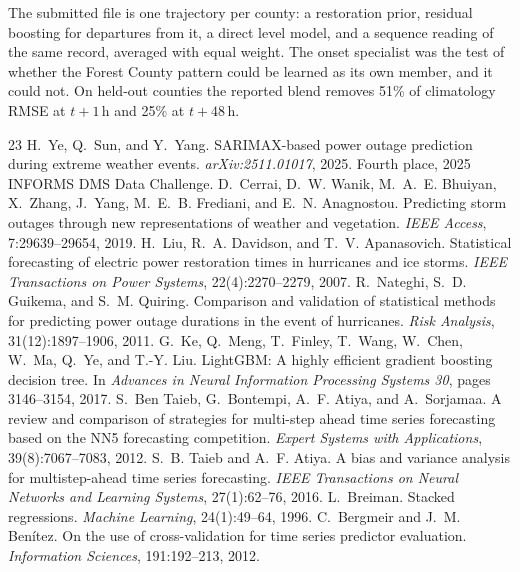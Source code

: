 \documentclass[10pt]{article}
\begin{document}
The submitted file is one trajectory per county: a restoration prior, residual boosting for departures from it, a direct level model, and a sequence reading of the same record, averaged with equal weight. The onset specialist was the test of whether the Forest County pattern could be learned as its own member, and it could not. On held-out counties the reported blend removes 51\% of climatology RMSE at $t{+}1$\,h and 25\% at $t{+}48$\,h.

\clearpage
\small

\begin{thebibliography}{23}
 H.~Ye, Q.~Sun, and Y.~Yang. SARIMAX-based power outage prediction during extreme weather events. \emph{arXiv:2511.01017}, 2025. Fourth place, 2025 INFORMS DMS Data Challenge.
 D.~Cerrai, D.~W. Wanik, M.~A.~E. Bhuiyan, X.~Zhang, J.~Yang, M.~E.~B. Frediani, and E.~N. Anagnostou. Predicting storm outages through new representations of weather and vegetation. \emph{IEEE Access}, 7:29639--29654, 2019.
 H.~Liu, R.~A. Davidson, and T.~V. Apanasovich. Statistical forecasting of electric power restoration times in hurricanes and ice storms. \emph{IEEE Transactions on Power Systems}, 22(4):2270--2279, 2007.
 R.~Nateghi, S.~D. Guikema, and S.~M. Quiring. Comparison and validation of statistical methods for predicting power outage durations in the event of hurricanes. \emph{Risk Analysis}, 31(12):1897--1906, 2011.
 G.~Ke, Q.~Meng, T.~Finley, T.~Wang, W.~Chen, W.~Ma, Q.~Ye, and T.-Y. Liu. LightGBM: A highly efficient gradient boosting decision tree. In \emph{Advances in Neural Information Processing Systems 30}, pages 3146--3154, 2017.
 S.~Ben Taieb, G.~Bontempi, A.~F. Atiya, and A.~Sorjamaa. A review and comparison of strategies for multi-step ahead time series forecasting based on the NN5 forecasting competition. \emph{Expert Systems with Applications}, 39(8):7067--7083, 2012.
 S.~B. Taieb and A.~F. Atiya. A bias and variance analysis for multistep-ahead time series forecasting. \emph{IEEE Transactions on Neural Networks and Learning Systems}, 27(1):62--76, 2016.
 L.~Breiman. Stacked regressions. \emph{Machine Learning}, 24(1):49--64, 1996.
 C.~Bergmeir and J.~M. Ben\'itez. On the use of cross-validation for time series predictor evaluation. \emph{Information Sciences}, 191:192--213, 2012.

\end{thebibliography}
\end{document}
